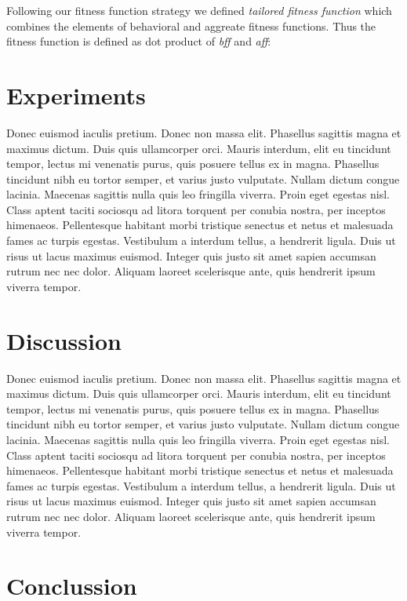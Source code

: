 \documentclass[format=acmsmall, review=false, screen=true]{acmart}
\begin{document}
Following our fitness function strategy we defined \emph{tailored fitness function} which combines the elements of behavioral and aggreate fitness functions. Thus the fitness function is defined as dot product of \emph{bff} and \emph{aff}:



\section{Experiments}

Donec euismod iaculis pretium. Donec non massa elit. Phasellus sagittis magna et maximus dictum. Duis quis ullamcorper orci. Mauris interdum, elit eu tincidunt tempor, lectus mi venenatis purus, quis posuere tellus ex in magna. Phasellus tincidunt nibh eu tortor semper, et varius justo vulputate. Nullam dictum congue lacinia. Maecenas sagittis nulla quis leo fringilla viverra. Proin eget egestas nisl. Class aptent taciti sociosqu ad litora torquent per conubia nostra, per inceptos himenaeos. Pellentesque habitant morbi tristique senectus et netus et malesuada fames ac turpis egestas. Vestibulum a interdum tellus, a hendrerit ligula. Duis ut risus ut lacus maximus euismod. Integer quis justo sit amet sapien accumsan rutrum nec nec dolor. Aliquam laoreet scelerisque ante, quis hendrerit ipsum viverra tempor.

\section{Discussion}

Donec euismod iaculis pretium. Donec non massa elit. Phasellus sagittis magna et maximus dictum. Duis quis ullamcorper orci. Mauris interdum, elit eu tincidunt tempor, lectus mi venenatis purus, quis posuere tellus ex in magna. Phasellus tincidunt nibh eu tortor semper, et varius justo vulputate. Nullam dictum congue lacinia. Maecenas sagittis nulla quis leo fringilla viverra. Proin eget egestas nisl. Class aptent taciti sociosqu ad litora torquent per conubia nostra, per inceptos himenaeos. Pellentesque habitant morbi tristique senectus et netus et malesuada fames ac turpis egestas. Vestibulum a interdum tellus, a hendrerit ligula. Duis ut risus ut lacus maximus euismod. Integer quis justo sit amet sapien accumsan rutrum nec nec dolor. Aliquam laoreet scelerisque ante, quis hendrerit ipsum viverra tempor.

\section{Conclussion}
\end{document}
